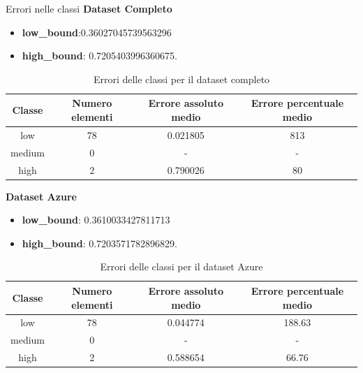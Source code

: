 \begin{frame}{Errori nelle classi}
\scriptsize 
\textbf{Dataset Completo}
\begin{itemize}
    \item \textbf{low\_bound}:0.36027045739563296
    \item \textbf{high\_bound}: 0.7205403996360675.
\end{itemize}


\begin{table}[H]
    \centering
    \begin{tabular}{|c|c|c|c|}
        \hline
        \textbf{Classe} &  \textbf{Numero elementi} & \textbf{Errore assoluto medio} & \textbf{Errore percentuale medio} \\ \hline
        low             & 78                & 0.021805                   & 813            \\ \hline
        medium          & 0                & -                  & -            \\ \hline
        high            & 2                & 0.790026                   & 80            \\ \hline
    \end{tabular}
    \caption{Errori delle classi per il dataset completo}
\end{table}



\textbf{Dataset Azure}
\begin{itemize}
    \item \textbf{low\_bound}: 0.3610033427811713
    \item  \textbf{high\_bound}: 0.7203571782896829.
\end{itemize}

\begin{table}[H]
    \centering
    \begin{tabular}{|c|c|c|c|}
        \hline
        \textbf{Classe} &  \textbf{Numero elementi} & \textbf{Errore assoluto medio} & \textbf{Errore percentuale medio} \\ \hline
        low             & 78                & 0.044774                   & 188.63            \\ \hline
        medium          & 0                & -                  & -            \\ \hline
        high            & 2                & 0.588654                   & 66.76            \\ \hline
    \end{tabular}
    \caption{Errori delle classi per il dataset Azure}
\end{table}

\end{frame}